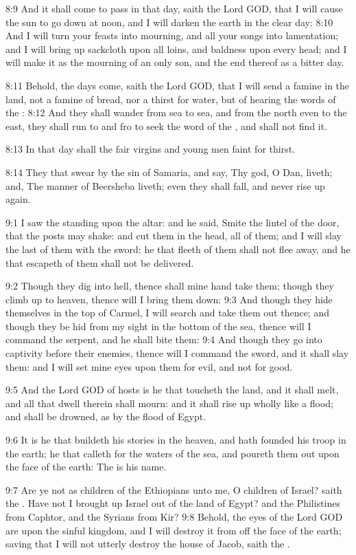 8:9 And it shall come to pass in that day, saith the Lord GOD, that I
will cause the sun to go down at noon, and I will darken the earth in
the clear day: 8:10 And I will turn your feasts into mourning, and all
your songs into lamentation; and I will bring up sackcloth upon all
loins, and baldness upon every head; and I will make it as the
mourning of an only son, and the end thereof as a bitter day.

8:11 Behold, the days come, saith the Lord GOD, that I will send a
famine in the land, not a famine of bread, nor a thirst for water, but
of hearing the words of the \LORD: 8:12 And they shall wander from sea
to sea, and from the north even to the east, they shall run to and fro
to seek the word of the \LORD, and shall not find it.

8:13 In that day shall the fair virgins and young men faint for
thirst.

8:14 They that swear by the sin of Samaria, and say, Thy god, O Dan,
liveth; and, The manner of Beersheba liveth; even they shall fall, and
never rise up again.

9:1 I saw the \LORD standing upon the altar: and he said, Smite the
lintel of the door, that the posts may shake: and cut them in the
head, all of them; and I will slay the last of them with the sword: he
that fleeth of them shall not flee away, and he that escapeth of them
shall not be delivered.

9:2 Though they dig into hell, thence shall mine hand take them;
though they climb up to heaven, thence will I bring them down: 9:3 And
though they hide themselves in the top of Carmel, I will search and
take them out thence; and though they be hid from my sight in the
bottom of the sea, thence will I command the serpent, and he shall
bite them: 9:4 And though they go into captivity before their enemies,
thence will I command the sword, and it shall slay them: and I will
set mine eyes upon them for evil, and not for good.

9:5 And the Lord GOD of hosts is he that toucheth the land, and it
shall melt, and all that dwell therein shall mourn: and it shall rise
up wholly like a flood; and shall be drowned, as by the flood of
Egypt.

9:6 It is he that buildeth his stories in the heaven, and hath founded
his troop in the earth; he that calleth for the waters of the sea, and
poureth them out upon the face of the earth: The \LORD is his name.

9:7 Are ye not as children of the Ethiopians unto me, O children of
Israel? saith the \LORD. Have not I brought up Israel out of the land
of Egypt? and the Philistines from Caphtor, and the Syrians from Kir?
9:8 Behold, the eyes of the Lord GOD are upon the sinful kingdom, and
I will destroy it from off the face of the earth; saving that I will
not utterly destroy the house of Jacob, saith the \LORD.

